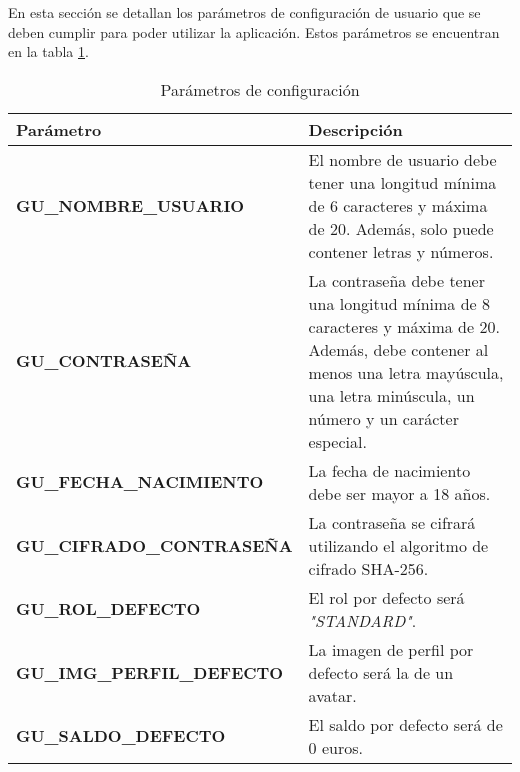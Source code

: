 En esta sección se detallan los parámetros de configuración de usuario que se deben cumplir para poder utilizar la aplicación. Estos parámetros se encuentran en la tabla \ref{table:user_settings}.
\begin{table}[htb]
    \centering
    \caption{Parámetros de configuración}
    \label{table:user_settings}
    \begin{tabular}{>{\columncolor{lightgreen!20}}p{7cm} p{10cm}}
    \toprule
    \rowcolor{darkgreen!50}
    \textbf{Parámetro} & \textbf{Descripción} \\
    \midrule
    \textbf{GU\_NOMBRE\_USUARIO} & El nombre de usuario debe tener una longitud mínima de 6 caracteres y máxima de 20. Además, solo puede contener letras y números. \\
    \midrule
    \textbf{GU\_CONTRASEÑA} & La contraseña debe tener una longitud mínima de 8 caracteres y máxima de 20. Además, debe contener al menos una letra mayúscula, una letra minúscula, un número y un carácter especial. \\
    \midrule
    \textbf{GU\_FECHA\_NACIMIENTO} & La fecha de nacimiento debe ser mayor a 18 años. \\
    \midrule
    \textbf{GU\_CIFRADO\_CONTRASEÑA} & La contraseña se cifrará utilizando el algoritmo de cifrado SHA-256. \\
    \midrule
    \textbf{GU\_ROL\_DEFECTO} & El rol por defecto será \textit{"STANDARD"}. \\
    \midrule
    \textbf{GU\_IMG\_PERFIL\_DEFECTO} & La imagen de perfil por defecto será la de un avatar. \\
    \midrule
    \textbf{GU\_SALDO\_DEFECTO} & El saldo por defecto será de 0 euros. \\
    \bottomrule
    \end{tabular}
\end{table}